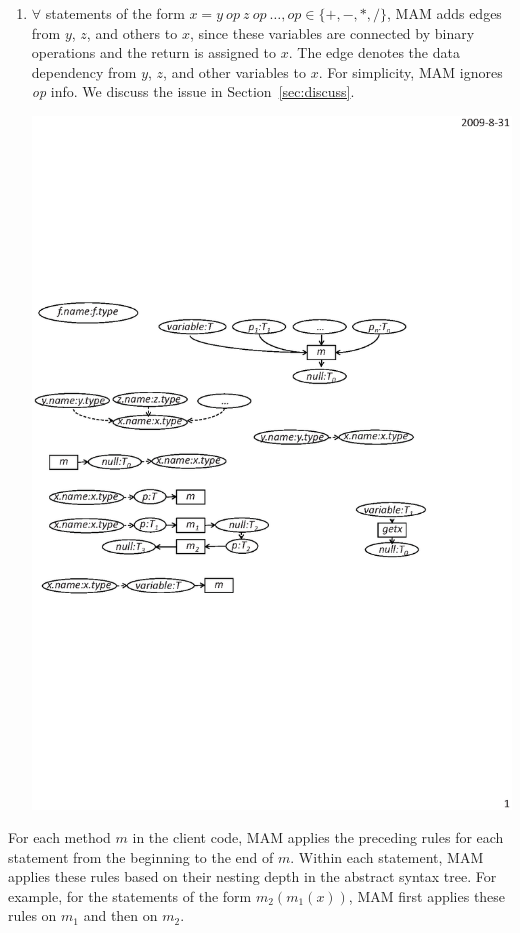 \begin{enumerate}
\item $\forall$ statements of the form $ x = y\ op\ z\ op\ \ldots, op \in \{+,-,*,/\}$,
MAM adds edges from $y$, $z$, and others to $x$, since these
variables are connected by binary operations and the return is
assigned to $x$. The edge denotes the data dependency from $y$, $z$,
and other variables to $x$. For simplicity, MAM ignores
\emph{op} info. We discuss the issue in
Section~\ref{sec:discuss}.\vspace*{-1.5ex}
\begin{center}
\includegraphics[scale=0.7,clip]{figure/rule9.eps}%
\end{center}\vspace*{-2ex}
\end{enumerate}

For each method $m$ in the client code, MAM applies the preceding
rules for each statement from the beginning to the end of $m$.
Within each statement, MAM applies these rules based on
their nesting depth in the abstract syntax tree. For example,
for the statements of the form $m_2(m_1(x))$, MAM first applies
these rules on $m_1$ and then on $m_2$.

